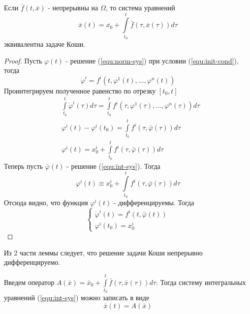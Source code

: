 \begin{lemma}
    Если $\bar{f}(t, \bar{x})$ - непрерывны на $\Omega$, то система уравнений
    \begin{equation}
        \label{equ:int-sys}
        \overline{x}(t) = \overline{x_0} + \int\limits_{t_0}^t\bar{f}(\tau, \overline{x}(\tau))d\tau
    \end{equation}
    эквивалентна задаче Коши.
\end{lemma}

\begin{proof}
    Пусть $\varphi(t)$ - решение (\ref{equ:norm-sys}) при условии (\ref{equ:init-cond}), тогда
    \[
        \dot{\varphi}^i = f^i(t, \varphi^1(t), \dots, \varphi^n(t))
    \]
    Проинтегрируем полученное равенство по отрезку $[t_0, t]$
    \begin{align*}
        &\int\limits_{t_0}^t \dot{\varphi}^i(\tau)d\tau = \int\limits_{t_0}^t f^i(\tau, \varphi^1(\tau), \dots, \varphi^n(\tau)) d\tau \\
        &\varphi^i(t) - \varphi^i(t_0) = \int\limits_{t_0}^t f^i(\tau, \bar\varphi(\tau))d\tau \\
        &\varphi^i(t) = x_0^i + \int\limits_{t_0}^t f^i(\tau, \bar\varphi(\tau))d\tau
    \end{align*}
    Теперь пусть $\bar{\varphi}(t)$ - решение (\ref{equ:int-sys}). Тогда
    \[
        \varphi^i(t) \equiv x_0^i + \int\limits_{t_0}^t f^i(\tau, \bar{\varphi}(\tau))d\tau
    \]
    Отсюда видно, что функция $\varphi^i(t)$ - дифференцируемы. Тогда
    \begin{equation}
    \begin{cases*}
        \dot{\varphi}^i(t) = f^i(t, \bar{\varphi}(t)) \\
        \varphi^i(t_0) = x_0^i
    \end{cases*}
    \end{equation}
\end{proof}

\begin{corollary}
    Из 2 части леммы следует, что решение задачи Коши непрерывно дифференцируемо.
\end{corollary}

Введем оператор $A(\bar{x}) = \bar{x}_0 + \int\limits_{t_0}^t \bar{f}(\tau, \bar{x}(\tau)) d\tau$. Тогда систему интегральных уравнений (\ref{equ:int-sys}) можно записать в виде 
\begin{equation}
    \label{equ:altern}
    \bar{x}(t) = A(\bar{x})
\end{equation}

